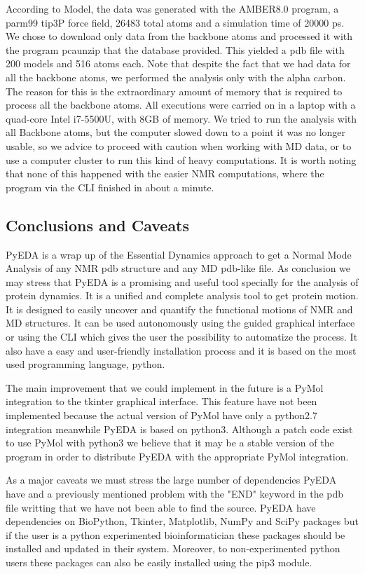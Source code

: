 \documentclass[12pt]{article}
\begin{document}
According to Model, the data was generated with the AMBER8.0 program, a 	parm99 tip3P force field, 26483 total atoms and a simulation time of 20000 ps. We chose to download only data from the backbone atoms and processed it with the program pcaunzip that the database provided. This yielded a pdb file with 200 models and 516 atoms each. Note that despite the fact that we had data for all the backbone atoms, we performed the analysis only with the alpha carbon. The reason for this is the extraordinary amount of memory that is required to process all the backbone atoms. All executions were carried on in a laptop with a quad-core Intel i7-5500U, with 8GB of memory. We tried to run the analysis with all Backbone atoms, but the computer slowed down to a point it was no longer usable, so we advice to proceed with caution when working with MD data, or to use a computer cluster to run this kind of heavy computations. It is worth noting that none of this happened with the easier NMR computations, where the program via the CLI finished in about a minute.\\


\subsection{Conclusions and Caveats}
PyEDA is a wrap up of the Essential Dynamics approach to get a Normal Mode Analysis of any NMR pdb structure and any MD pdb-like file. As conclusion we may stress that PyEDA is a promising and useful tool specially for the analysis of protein dynamics.  It is a unified and complete analysis tool to get protein motion. It is designed to easily uncover and quantify the functional motions of NMR and MD structures. It can be used autonomously using the guided graphical interface or using the CLI which gives the user the possibility to automatize the process. It also have a easy and user-friendly installation process and it is based on the most used programming language, python. 

The main improvement that we could implement in the future is a PyMol integration to the tkinter graphical interface. This feature have not been implemented because the actual version of PyMol have only a python2.7 integration meanwhile PyEDA is based on python3. Although a patch code exist to use PyMol with python3 we believe that it may be a stable version of the program in order to distribute PyEDA with the appropriate PyMol integration. 

As a major caveats we must stress the large number of dependencies PyEDA have and a previously mentioned problem with the "END" keyword in the pdb file writting that we have not been able to find the source. PyEDA have dependencies on  BioPython\citep{Cock2009}, Tkinter, Matplotlib\citep{Hunter2007}, NumPy and SciPy\citep{VanderWalt2011} packages but if the user is a python experimented bioinformatician these packages should be installed and updated in their system. Moreover, to non-experimented python users these packages can also be easily installed using the pip3 module. 
\end{document}
